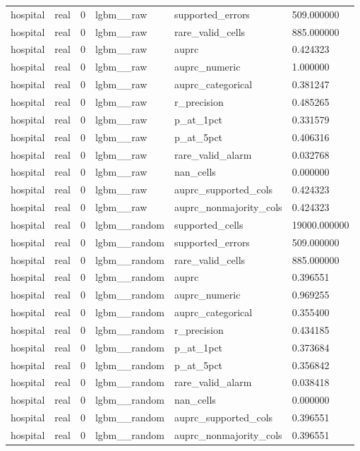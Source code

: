 \begin{tabular}{llllll}
hospital & real & 0 & lgbm\_\_raw & supported\_errors & 509.000000 \\
hospital & real & 0 & lgbm\_\_raw & rare\_valid\_cells & 885.000000 \\
hospital & real & 0 & lgbm\_\_raw & auprc & 0.424323 \\
hospital & real & 0 & lgbm\_\_raw & auprc\_numeric & 1.000000 \\
hospital & real & 0 & lgbm\_\_raw & auprc\_categorical & 0.381247 \\
hospital & real & 0 & lgbm\_\_raw & r\_precision & 0.485265 \\
hospital & real & 0 & lgbm\_\_raw & p\_at\_1pct & 0.331579 \\
hospital & real & 0 & lgbm\_\_raw & p\_at\_5pct & 0.406316 \\
hospital & real & 0 & lgbm\_\_raw & rare\_valid\_alarm & 0.032768 \\
hospital & real & 0 & lgbm\_\_raw & nan\_cells & 0.000000 \\
hospital & real & 0 & lgbm\_\_raw & auprc\_supported\_cols & 0.424323 \\
hospital & real & 0 & lgbm\_\_raw & auprc\_nonmajority\_cols & 0.424323 \\
hospital & real & 0 & lgbm\_\_random & supported\_cells & 19000.000000 \\
hospital & real & 0 & lgbm\_\_random & supported\_errors & 509.000000 \\
hospital & real & 0 & lgbm\_\_random & rare\_valid\_cells & 885.000000 \\
hospital & real & 0 & lgbm\_\_random & auprc & 0.396551 \\
hospital & real & 0 & lgbm\_\_random & auprc\_numeric & 0.969255 \\
hospital & real & 0 & lgbm\_\_random & auprc\_categorical & 0.355400 \\
hospital & real & 0 & lgbm\_\_random & r\_precision & 0.434185 \\
hospital & real & 0 & lgbm\_\_random & p\_at\_1pct & 0.373684 \\
hospital & real & 0 & lgbm\_\_random & p\_at\_5pct & 0.356842 \\
hospital & real & 0 & lgbm\_\_random & rare\_valid\_alarm & 0.038418 \\
hospital & real & 0 & lgbm\_\_random & nan\_cells & 0.000000 \\
hospital & real & 0 & lgbm\_\_random & auprc\_supported\_cols & 0.396551 \\
hospital & real & 0 & lgbm\_\_random & auprc\_nonmajority\_cols & 0.396551 \\

\end{tabular}
